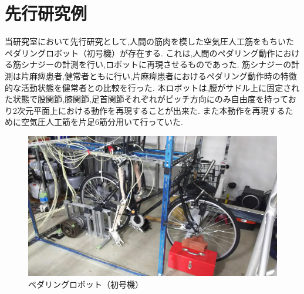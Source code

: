 \section{先行研究例}
当研究室において先行研究として,人間の筋肉を模した空気圧人工筋をもちいたペダリングロボット（初号機）が存在する.
これは,人間のペダリング動作における筋シナジーの計測を行い,ロボットに再現させるものであった.
筋シナジーの計測は片麻痺患者,健常者ともに行い,片麻痺患者におけるペダリング動作時の特徴的な活動状態を健常者との比較を行った.
本ロボットは,腰がサドル上に固定された状態で股関節,膝関節,足首関節それぞれがピッチ方向にのみ自由度を持っており2次元平面上における動作を再現することが出来た.
また本動作を再現するために空気圧人工筋を片足6筋分用いて行っていた. %
\begin{figure}[h]
 \begin{center}
  \includegraphics[width=0.75\columnwidth,clip]{Photo/BackGround/1st.eps}
  \caption{ペダリングロボット（初号機）}
  \label{初号機}
  \end{center}
\end{figure}

